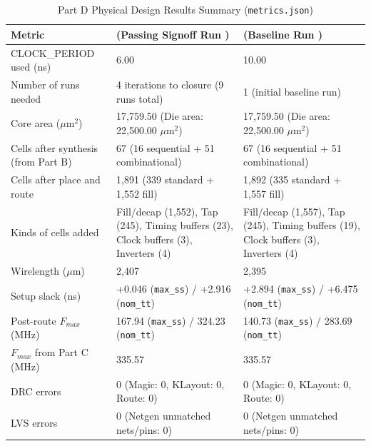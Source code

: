 \documentclass[12pt]{article}
\begin{document}
\begin{table}[H]
\centering
\small
\begin{tabular}{|l|p{5.2cm}|p{5.2cm}|}
\hline
\textbf{Metric} & (\textbf{Passing Signoff Run} ) & (\textbf{Baseline Run} ) \\ \hline
CLOCK\_PERIOD used (ns) & 6.00 & 10.00 \\ \hline
Number of runs needed & 4 iterations to closure (9 runs total) & 1 (initial baseline run) \\ \hline
Core area ($\mu\text{m}^2$) & 17,759.50 (Die area: 22,500.00 $\mu\text{m}^2$) & 17,759.50 (Die area: 22,500.00 $\mu\text{m}^2$) \\ \hline
Cells after synthesis (from Part B) & 67 (16 sequential + 51 combinational) & 67 (16 sequential + 51 combinational) \\ \hline
Cells after place and route & 1,891 (339 standard + 1,552 fill) & 1,892 (335 standard + 1,557 fill) \\ \hline
Kinds of cells added & Fill/decap (1,552), Tap (245), Timing buffers (23), Clock buffers (3), Inverters (4) & Fill/decap (1,557), Tap (245), Timing buffers (19), Clock buffers (3), Inverters (4) \\ \hline
Wirelength ($\mu\text{m}$) & 2,407 & 2,395 \\ \hline
Setup slack (ns) & +0.046 (\texttt{max\_ss}) / +2.916 (\texttt{nom\_tt}) & +2.894 (\texttt{max\_ss}) / +6.475 (\texttt{nom\_tt}) \\ \hline
Post-route $F_{max}$ (MHz) & 167.94 (\texttt{max\_ss}) / 324.23 (\texttt{nom\_tt}) & 140.73 (\texttt{max\_ss}) / 283.69 (\texttt{nom\_tt}) \\ \hline
$F_{max}$ from Part C (MHz) & 335.57 & 335.57 \\ \hline
DRC errors & 0 (Magic: 0, KLayout: 0, Route: 0) & 0 (Magic: 0, KLayout: 0, Route: 0) \\ \hline
LVS errors & 0 (Netgen unmatched nets/pins: 0) & 0 (Netgen unmatched nets/pins: 0) \\ \hline
\end{tabular}
\caption{Part D Physical Design Results Summary (\texttt{metrics.json})}
\label{tab:partd_results}
\end{table}
\end{document}
